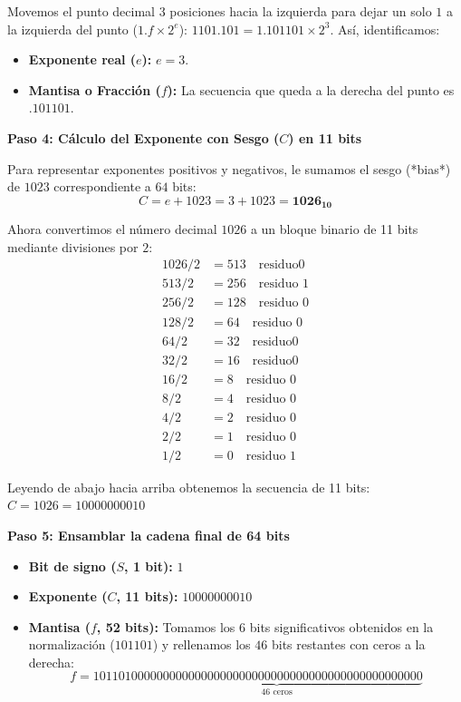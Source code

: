 \documentclass[12pt]{article}
\begin{document}
Movemos el punto decimal $3$ posiciones hacia la izquierda para dejar un solo $1$ 
a la izquierda del punto ($1.f \times 2^e$):
$ 1101.101 = 1.101101 \times 2^3 $. Así, identificamos:
\begin{itemize}
    \item \textbf{Exponente real ($e$):} $e = 3$.
    \item \textbf{Mantisa o Fracción ($f$):} La secuencia que queda a la derecha del punto es $.101101$.
\end{itemize}

\vspace{0.5em}

\noindent \textbf{Paso 4: Cálculo del Exponente con Sesgo ($C$) en 11 bits}

Para representar exponentes positivos y negativos, le sumamos el sesgo (*bias*) de $1023$ correspondiente a $64$ bits:
\[
C = e + 1023 = 3 + 1023 = \mathbf{1026_{10}}
\]

Ahora convertimos el número decimal $1026$ a un bloque binario de 11 bits mediante divisiones por $2$:
\begin{align*}
1026/ 2 &= 513 \quad \text{residuo} 0 \\
513 / 2 &= 256 \quad \text{residuo } 1  \\
256 / 2 &= 128 \quad \text{residuo } 0  \\
128 / 2 &= 64 \quad \text{residuo } 0 \\
64/ 2 &= 32 \quad \text{residuo} 0 \\
32/ 2 &= 16 \quad \text{residuo} 0 \\
16/ 2 &= 8 \quad \text{residuo } 0 \\
8 /2 &= 4 \quad \text{residuo } 0 \\
4 /2 &= 2 \quad \text{residuo } 0 \\
2 /2 &= 1 \quad \text{residuo } 0 \\
1 /2 &= 0 \quad \text{residuo } 1 
\end{align*}

Leyendo de abajo hacia arriba obtenemos la secuencia de 11 bits:
$C = 1026 = 10000000010$

\vspace{0.5em}

\noindent \textbf{Paso 5: Ensamblar la cadena final de 64 bits}

\begin{itemize}
    \item \textbf{Bit de signo ($S$, 1 bit):} $1$
    \item \textbf{Exponente ($C$, 11 bits):} $10000000010$
    \item \textbf{Mantisa ($f$, 52 bits):} Tomamos los $6$ bits significativos obtenidos en la normalización ($101101$) y rellenamos los $46$ bits restantes con ceros a la derecha:
    \[
    f = 101101\underbrace{0000000000000000000000000000000000000000000000}_{46 \text{ ceros}}
    \]
\end{itemize}
\end{document}

